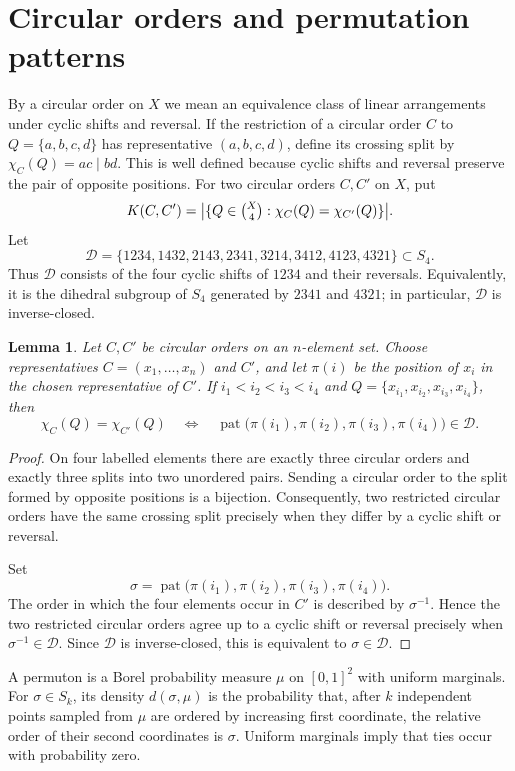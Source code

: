 \documentclass[a4paper]{amsart}
\newtheorem{lemma}[theorem]{Lemma}
\theoremstyle{remark}
\newcommand{\pat}{\operatorname{pat}}
\newcommand{\Dih}{\mathcal D}
\begin{document}
\section{Circular orders and permutation patterns}

By a circular order on $X$ we mean an equivalence class of linear
arrangements under cyclic shifts and reversal. If the restriction of
a circular order $C$ to $Q=\{a,b,c,d\}$ has representative
$(a,b,c,d)$, define its crossing split by $\chi_C(Q)=ac\mid bd$.
This is well defined because cyclic shifts and reversal preserve the
pair of opposite positions. For two circular orders $C,C'$ on $X$,
put
\[
 K(C,C')
 =
 \bigl|\{Q\in\tbinom X4:\chi_C(Q)=\chi_{C'}(Q)\}\bigr|.
\]
Let
\[
 \Dih
 =
 \{1234,1432,2143,2341,3214,3412,4123,4321\}
 \subset S_4.
\]
Thus $\Dih$ consists of the four cyclic shifts of $1234$ and their
reversals. Equivalently, it is the dihedral subgroup of $S_4$
generated by $2341$ and $4321$; in particular, $\Dih$ is
inverse-closed.

\begin{lemma}\label{lem:relative-permutation}
Let $C,C'$ be circular orders on an $n$-element set. Choose
representatives $C=(x_1,\ldots,x_n)$ and $C'$, and let $\pi(i)$ be
the position of $x_i$ in the chosen representative of $C'$. If
$i_1<i_2<i_3<i_4$ and
$Q=\{x_{i_1},x_{i_2},x_{i_3},x_{i_4}\}$, then
\[
 \chi_C(Q)=\chi_{C'}(Q)
 \quad\Longleftrightarrow\quad
 \pat\bigl(\pi(i_1),\pi(i_2),\pi(i_3),\pi(i_4)\bigr)\in\Dih.
\]
\end{lemma}

\begin{proof}
On four labelled elements there are exactly three circular orders and
exactly three splits into two unordered pairs. Sending a circular
order to the split formed by opposite positions is a bijection.
Consequently, two restricted circular orders have the same crossing
split precisely when they differ by a cyclic shift or reversal.

Set
\[
 \sigma
 =
 \pat\bigl(\pi(i_1),\pi(i_2),\pi(i_3),\pi(i_4)\bigr).
\]
The order in which the four elements occur in $C'$ is described by
$\sigma^{-1}$. Hence the two restricted circular orders agree up to a
cyclic shift or reversal precisely when $\sigma^{-1}\in\Dih$. Since
$\Dih$ is inverse-closed, this is equivalent to $\sigma\in\Dih$.
\end{proof}

A permuton is a Borel probability measure $\mu$ on $[0,1]^2$ with
uniform marginals. For $\sigma\in S_k$, its density
$d(\sigma,\mu)$ is the probability that, after $k$ independent
points sampled from $\mu$ are ordered by increasing first coordinate,
the relative order of their second coordinates is $\sigma$. Uniform
marginals imply that ties occur with probability zero.
\end{document}
